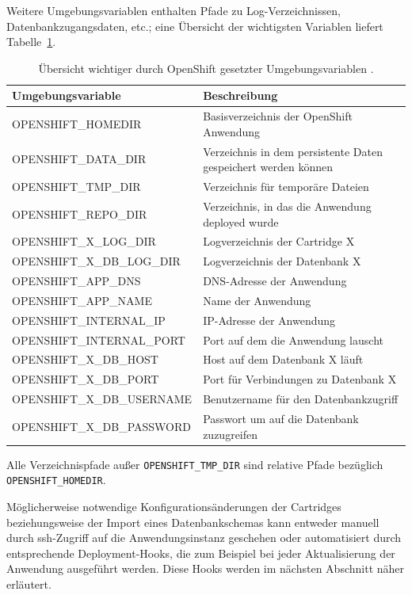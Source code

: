 \documentclass[10pt,a4paper,compsoc]{IEEEtran}
\begin{document}
Weitere Umgebungsvariablen enthalten Pfade zu Log-Verzeichnissen, Datenbankzugangsdaten, etc.; eine Übersicht der wichtigsten Variablen liefert Tabelle~\ref{tab:variables}.
\begin{table}[htbp]
\centering
\begin{tabularx}{\columnwidth}{XX}
\toprule
Umgebungsvariable & Beschreibung \\
\midrule
OPENSHIFT\_HOMEDIR & Basisverzeichnis der OpenShift Anwendung \\
OPENSHIFT\_DATA\_DIR & Verzeichnis in dem persistente Daten gespeichert werden können \\
OPENSHIFT\_TMP\_DIR & Verzeichnis für temporäre Dateien \\
OPENSHIFT\_REPO\_DIR & Verzeichnis, in das die Anwendung deployed wurde \\
OPENSHIFT\_X\_LOG\_DIR & Logverzeichnis der Cartridge X\\
OPENSHIFT\_X\_DB\_LOG\_DIR & Logverzeichnis der Datenbank X\\
\midrule
OPENSHIFT\_APP\_DNS & DNS-Adresse der Anwendung \\
OPENSHIFT\_APP\_NAME & Name der Anwendung \\
OPENSHIFT\_INTERNAL\_IP & IP-Adresse der Anwendung \\
OPENSHIFT\_INTERNAL\_PORT & Port auf dem die Anwendung lauscht \\
\midrule
OPENSHIFT\_X\_DB\_HOST & Host auf dem Datenbank X läuft \\
OPENSHIFT\_X\_DB\_PORT & Port für Verbindungen zu Datenbank X \\
OPENSHIFT\_X\_DB\_USERNAME & Benutzername für den Datenbankzugriff \\
OPENSHIFT\_X\_DB\_PASSWORD & Passwort um auf die Datenbank zuzugreifen \\
\bottomrule
\end{tabularx}
\caption{Übersicht wichtiger durch OpenShift gesetzter Umgebungsvariablen \cite[S. 59]{os_user_guide}.}
\label{tab:variables}
\end{table}

Alle Verzeichnispfade außer \verb!OPENSHIFT_TMP_DIR! sind relative Pfade bezüglich \verb!OPENSHIFT_HOMEDIR!.

Möglicherweise notwendige Konfigurationsänderungen der Cartridges beziehungsweise der Import eines Datenbankschemas kann entweder manuell durch ssh-Zugriff auf die Anwendungsinstanz geschehen oder automatisiert durch entsprechende Deployment-Hooks, die zum Beispiel bei jeder Aktualisierung der Anwendung ausgeführt werden. Diese Hooks werden im nächsten Abschnitt näher erläutert.
\end{document}
